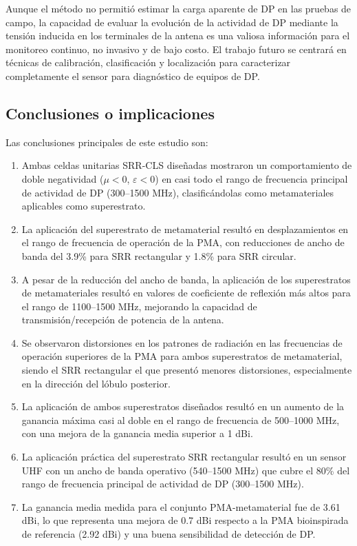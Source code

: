 \documentclass[11pt,a4paper]{article}
\begin{document}
Aunque el método no permitió estimar la carga aparente de DP en las pruebas de campo, la capacidad de evaluar la evolución de la actividad de DP mediante la tensión inducida en los terminales de la antena es una valiosa información para el monitoreo continuo, no invasivo y de bajo costo. El trabajo futuro se centrará en técnicas de calibración, clasificación y localización para caracterizar completamente el sensor para diagnóstico de equipos de DP.

\subsection*{Conclusiones o implicaciones}
Las conclusiones principales de este estudio son:
\begin{enumerate}
    \item Ambas celdas unitarias SRR-CLS diseñadas mostraron un comportamiento de doble negatividad ($\mu < 0$, $\varepsilon < 0$) en casi todo el rango de frecuencia principal de actividad de DP (300--1500 MHz), clasificándolas como metamateriales aplicables como superestrato.
    \item La aplicación del superestrato de metamaterial resultó en desplazamientos en el rango de frecuencia de operación de la PMA, con reducciones de ancho de banda del 3.9\% para SRR rectangular y 1.8\% para SRR circular.
    \item A pesar de la reducción del ancho de banda, la aplicación de los superestratos de metamateriales resultó en valores de coeficiente de reflexión más altos para el rango de 1100--1500 MHz, mejorando la capacidad de transmisión/recepción de potencia de la antena.
    \item Se observaron distorsiones en los patrones de radiación en las frecuencias de operación superiores de la PMA para ambos superestratos de metamaterial, siendo el SRR rectangular el que presentó menores distorsiones, especialmente en la dirección del lóbulo posterior.
    \item La aplicación de ambos superestratos diseñados resultó en un aumento de la ganancia máxima casi al doble en el rango de frecuencia de 500--1000 MHz, con una mejora de la ganancia media superior a 1 dBi.
    \item La aplicación práctica del superestrato SRR rectangular resultó en un sensor UHF con un ancho de banda operativo (540--1500 MHz) que cubre el 80\% del rango de frecuencia principal de actividad de DP (300--1500 MHz).
    \item La ganancia media medida para el conjunto PMA-metamaterial fue de 3.61 dBi, lo que representa una mejora de 0.7 dBi respecto a la PMA bioinspirada de referencia (2.92 dBi) y una buena sensibilidad de detección de DP.

\end{enumerate}
\end{document}
